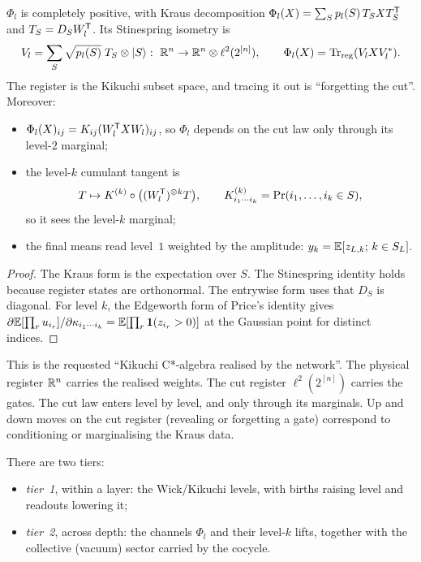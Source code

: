 \begin{proposition}\label{prop:kraus}
$\Phi_l$ is completely positive, with Kraus decomposition $\Phi_l(X)=\sum_Sp_l(S)\,T_SXT_S^{\mathsf T}$ and $T_S=D_SW_l^{\mathsf T}$. Its
Stinespring isometry is
\[
V_l=\sum_S\sqrt{p_l(S)}\;T_S\otimes|S\rangle:\ \R^n\to\R^n\otimes\ell^2(2^{[n]}),\qquad\Phi_l(X)=\operatorname{Tr}_{\rm reg}(V_lXV_l^*).
\]
The register is the Kikuchi subset space, and tracing it out is ``forgetting the cut''. Moreover:
\begin{itemize}[leftmargin=1.2em,itemsep=0pt,topsep=1pt]
\item $\Phi_l(X)_{ij}=K_{ij}(W_l^{\mathsf T} XW_l)_{ij}$, so $\Phi_l$ depends on the cut law only through its level-$2$ marginal;
\item the level-$k$ cumulant tangent is
\[
T\mapsto K^{(k)}\circ\big((W_l^{\mathsf T})^{\otimes k}T\big),\qquad K^{(k)}_{i_1\cdots i_k}=\Pr(i_1,\dots,i_k\in S),
\]
so it sees the level-$k$ marginal;
\item the final means read level~$1$ weighted by the amplitude: $y_k=\mathbb{E}[z_{L,k};\,k\in S_L]$.
\end{itemize}
\end{proposition}
\begin{proof}
The Kraus form is the expectation over $S$. The Stinespring identity holds because register states are
orthonormal. The entrywise form uses that $D_S$ is diagonal. For level $k$, the Edgeworth form of Price's
identity gives $\partial\mathbb{E}[\prod_ru_{i_r}]/\partial\kappa_{i_1\cdots i_k}=\mathbb{E}[\prod_r\mathbf 1(z_{i_r}>0)]$ at the Gaussian point
for distinct indices.
\end{proof}

This is the requested ``Kikuchi C*-algebra realised by the network''. The physical register $\mathbb{R}^n$ carries
the realised weights. The cut register $\ell^2(2^{[n]})$ carries the gates. The cut law enters level by level,
and only through its marginals. Up and down moves on the cut register (revealing or forgetting a gate)
correspond to conditioning or marginalising the Kraus data.

There are two tiers:
\begin{itemize}[leftmargin=1.2em,itemsep=0pt,topsep=1pt]
\item \emph{tier~1}, within a layer: the Wick/Kikuchi levels, with births raising level and readouts
lowering it;
\item \emph{tier~2}, across depth: the channels $\Phi_l$ and their level-$k$ lifts, together with the
collective (vacuum) sector carried by the cocycle.
\end{itemize}

